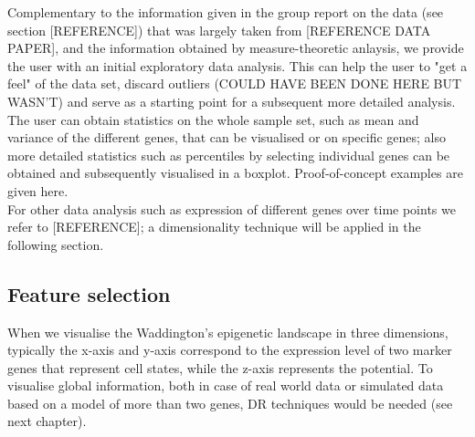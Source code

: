 \documentclass[journal, a4paper]{IEEEtran}
\begin{document}
Complementary to the information given in the group report on the data (see section [REFERENCE]) that was largely taken from [REFERENCE DATA PAPER], and the information obtained by measure-theoretic anlaysis, we provide the user with an initial exploratory data analysis. This can help the user to "get a feel" of the data set, discard outliers (COULD HAVE BEEN DONE HERE BUT WASN'T) and serve as a starting point for a subsequent more detailed analysis. \\
The user can obtain statistics on the whole sample set, such as mean and variance of the different genes, that can be visualised or on specific genes; also more detailed statistics such as percentiles by selecting individual genes can be obtained and subsequently visualised in a boxplot.
Proof-of-concept examples are given here.\\



For other data analysis such as  expression of different genes over time points we refer to [REFERENCE]; a dimensionality technique will be applied in the following section. 




\subsection{Feature selection}

When we visualise the Waddington's epigenetic landscape in three dimensions, typically the x-axis and y-axis correspond to the expression level of two marker genes that represent cell states, while the z-axis represents the potential. To visualise global information, both in case of real world data or simulated data based on a model of more than two genes, DR techniques would be needed (see next chapter).\\
\end{document}
